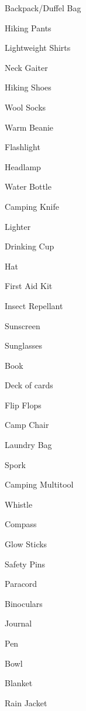 \documentclass{article}
\begin{document}
{\begin{multicols*}{3}
      \begin{packlist}
        \item Backpack/Duffel Bag
        \item Hiking Pants
        \item Lightweight Shirts
        \item Neck Gaiter
        \item Hiking Shoes
        \item Wool Socks
        \item Warm Beanie
        \item Flashlight
        \item Headlamp
        \item Water Bottle
        \item Camping Knife
        \item Lighter
        \item Drinking Cup
        \item Hat
        \item First Aid Kit
        \item Insect Repellant
        \item Sunscreen
        \item Sunglasses
      \end{packlist}


      \begin{packlist}
        \item Book
        \item Deck of cards
        \item Flip Flops
        \item Camp Chair
        \item Laundry Bag
        \item Spork
        \item Camping Multitool
        \item Whistle
        \item Compass
        \item Glow Sticks
        \item Safety Pins
        \item Paracord
        \item Binoculars
        \item Journal
        \item Pen
        \item Bowl
        \item Blanket
        \item Rain Jacket
      \end{packlist}


\end{multicols*}}
\end{document}
